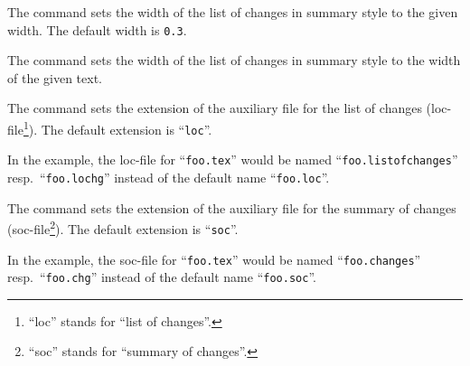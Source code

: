 




The command  sets the width of the list of changes in summary style to the given width.
The default width is \texttt{0.3}.






The command  sets the width of the list of changes in summary style to the width of the given text.






The command  sets the extension of the auxiliary file for the list of changes (loc-file\footnote{%
	``loc'' stands for ``list of changes''.
}).
The default extension is ``\texttt{loc}''.

In the example, the loc-file for ``\texttt{foo.tex}'' would be named ``\texttt{foo.listofchanges}'' resp.\ ``\texttt{foo.lochg}'' instead of the default name ``\texttt{foo.loc}''.







The command  sets the extension of the auxiliary file for the summary of changes (soc-file\footnote{%
	``soc'' stands for ``summary of changes''.
}).
The default extension is ``\texttt{soc}''.

In the example, the soc-file for ``\texttt{foo.tex}'' would be named ``\texttt{foo.changes}'' resp.\ ``\texttt{foo.chg}'' instead of the default name ``\texttt{foo.soc}''.






